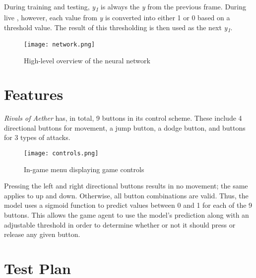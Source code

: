 During training and testing, \textit{y\textsubscript{1}} is always the \textit{y} from the previous frame. During live , however, each value from \textit{y} is converted into either 1 or 0 based on a threshold value. The result of this thresholding is then used as the next \textit{y\textsubscript{1}}.

\begin{figure}
    \caption{High-level overview of the neural network}
    \centering
    \texttt{[image: network.png]} \\
\end{figure}




\section{Features}

\textit{Rivals of Aether} has, in total, 9 buttons in its control scheme. These include 4 directional buttons for movement, a jump button, a dodge button, and buttons for 3 types of attacks.

\begin{figure}
	\caption{In-game menu displaying game controls}
	\centering
	\texttt{[image: controls.png]} \\
\end{figure}

Pressing the left and right directional buttons results in no movement; the same applies to up and down. Otherwise, all button combinations are valid. Thus, the model uses a sigmoid function to predict values between 0 and 1 for each of the 9 buttons. This allows the game agent to use the model's prediction along with an adjustable threshold in order to determine whether or not it should press or release any given button.




\section{Test Plan}

